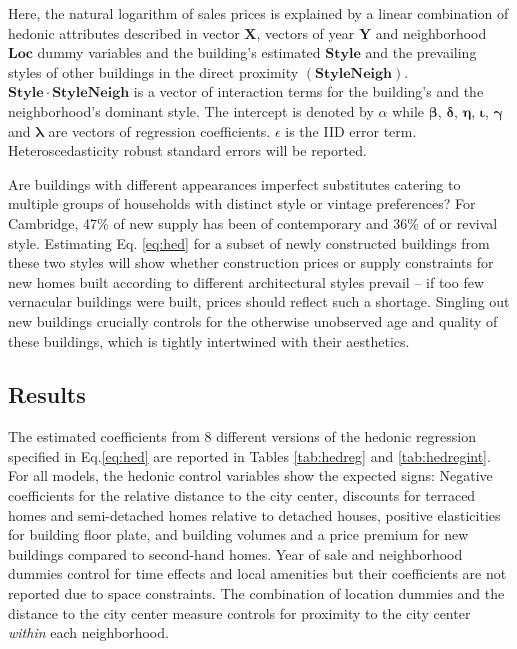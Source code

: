 \documentclass[]{article}
\begin{document}
Here, the natural logarithm of sales prices is explained by a linear
combination of hedonic attributes described in vector \(\mathbf{X}\),
vectors of year \(\mathbf{Y}\) and neighborhood \(\mathbf{Loc}\) dummy
variables and the building's estimated \(\mathbf{Style}\) and the
prevailing styles of other buildings in the direct proximity
\((\mathbf{StyleNeigh})\). \(\mathbf{Style\cdot StyleNeigh}\) is a
vector of interaction terms for the building's and the neighborhood's
dominant style. The intercept is denoted by \(\alpha\) while
\(\bm{\beta}\), \(\bm{\delta}\), \(\bm{\eta}\), \(\bm{\iota}\),
\(\bm{\gamma}\) and \(\bm{\lambda}\) are vectors of regression
coefficients. \(\epsilon\) is the IID error term. Heteroscedasticity
robust standard errors will be reported.

Are buildings with different appearances imperfect substitutes catering
to multiple groups of households with distinct style or vintage
preferences? For Cambridge, 47\% of new supply has been of contemporary and 36\% of or revival style. Estimating Eq.
\ref{eq:hed} for a subset of newly constructed buildings from these two styles will show whether construction prices or supply constraints for new homes built
according to different architectural styles prevail -- if too few
vernacular buildings were built, prices should reflect such a shortage.
Singling out new buildings crucially controls for the otherwise
unobserved age and quality of these buildings, which is tightly intertwined with
their aesthetics.


\hypertarget{Results}{%
\subsection{Results}\label{hedonic-regression-estimates}}

The estimated coefficients from 8 different versions of the hedonic regression specified in Eq.\eqref{eq:hed} are reported in Tables \ref{tab:hedreg} and \ref{tab:hedregint}. For all models, the hedonic control variables show the expected signs: Negative coefficients for the relative distance to the city center, discounts for terraced homes and semi-detached homes relative to detached houses, positive elasticities for building floor plate, and building volumes and a price premium for new buildings compared to second-hand homes. Year of sale and neighborhood dummies control for time effects and local amenities but their coefficients are not reported due to space constraints. The combination of location dummies and the distance to the city center measure controls for proximity to the city center \emph{within} each neighborhood.
\end{document}
